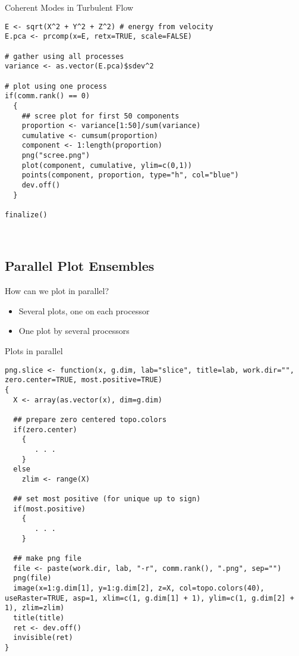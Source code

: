 \begin{frame}
  \begin{exampleblock}{Coherent Modes in Turbulent Flow}\pause
\begin{lstlisting}[title=Compute PCA and do Scree Plot (e0\_pca.r)]
E <- sqrt(X^2 + Y^2 + Z^2) # energy from velocity
E.pca <- prcomp(x=E, retx=TRUE, scale=FALSE) 

# gather using all processes
variance <- as.vector(E.pca)$sdev^2

# plot using one process
if(comm.rank() == 0)
  {
    ## scree plot for first 50 components
    proportion <- variance[1:50]/sum(variance)
    cumulative <- cumsum(proportion)
    component <- 1:length(proportion)
    png("scree.png")
    plot(component, cumulative, ylim=c(0,1))
    points(component, proportion, type="h", col="blue")
    dev.off()
  }

finalize()
        
        

\end{lstlisting} %
  \end{exampleblock}
\end{frame}

\setcounter{framenumber}{0}

\subsection{Parallel Plot Ensembles}

\begin{frame}
  \begin{block}{How can we plot in parallel?}\pause
  \begin{itemize}
    \item Several plots, one on each processor
    \item One plot by several processors
  \end{itemize}
  \end{block}
\end{frame}

\begin{frame}
  \begin{exampleblock}{Plots in parallel}\pause
\begin{lstlisting}[title=png.slice]
png.slice <- function(x, g.dim, lab="slice", title=lab, work.dir="", zero.center=TRUE, most.positive=TRUE)
{
  X <- array(as.vector(x), dim=g.dim)

  ## prepare zero centered topo.colors
  if(zero.center)
    {
       . . .
    }
  else
    zlim <- range(X)

  ## set most positive (for unique up to sign)
  if(most.positive)
    {
       . . .
    }
  
  ## make png file
  file <- paste(work.dir, lab, "-r", comm.rank(), ".png", sep="")
  png(file)
  image(x=1:g.dim[1], y=1:g.dim[2], z=X, col=topo.colors(40), useRaster=TRUE, asp=1, xlim=c(1, g.dim[1] + 1), ylim=c(1, g.dim[2] + 1), zlim=zlim)
  title(title)
  ret <- dev.off()
  invisible(ret)
}
\end{lstlisting}
  \end{exampleblock}
\end{frame}


